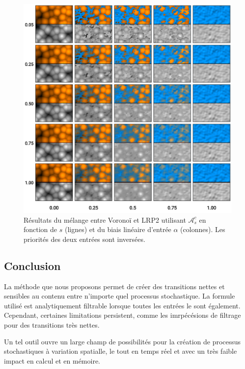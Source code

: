 \documentclass[9pt, twocolumn]{article} %
\begin{document}
\begin{figure}
  \includegraphics[width=\linewidth]{figures/MixMax_Smoothness_Alpha.png}
  \caption{
    Résultats du mélange entre Voronoï et LRP2 utilisant $\mathcal{A}^c_s$ en
    fonction de $s$ (lignes) et du biais linéaire d'entrée $\alpha$ (colonnes). Les
    priorités des deux entrées sont inversées.
  }
  \label{fig::MixMax_SmoothnessAlpha}
\end{figure}

\subsection{Conclusion}

La méthode que nous proposons permet de créer des transitions nettes et
sensibles au contenu entre n'importe quel processus stochastique. La formule
utilisé est analytiquement filtrable lorsque toutes les entrées le sont
également. Cependant, certaines limitations persistent, comme les imrpécésions
de filtrage pour des transitions très nettes.

Un tel outil ouvre un large champ de possibilités pour la création de processus
stochastiques à variation spatialle, le tout en temps réel et avec un très
faible impact en calcul et en mémoire.

\clearpage

\printbibliography %
\end{document}
